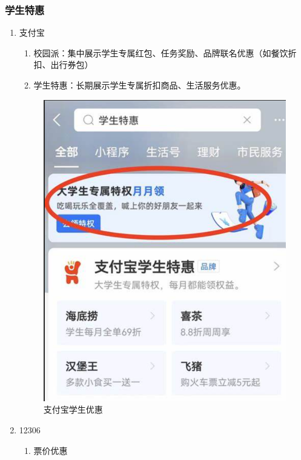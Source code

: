 \subsubsection{学生特惠}
\begin{enumerate}
  \item 支付宝
  \begin{enumerate}
    \item 校园派：集中展示学生专属红包、任务奖励、品牌联名优惠（如餐饮折扣、出行券包）
    \item 学生特惠：长期展示学生专属折扣商品、生活服务优惠。
  \end{enumerate}
  \begin{figure}[H]
    \centering
    \includegraphics[width=.8\textwidth]{./figures/生活/学生优惠_支付宝.png}
    \caption{支付宝学生优惠}
  \end{figure}
  \item 12306
  \begin{enumerate}
    \item 票价优惠
  \end{enumerate}
  \begin{figure}[H]
    \centering

\end{figure}
\end{enumerate}
